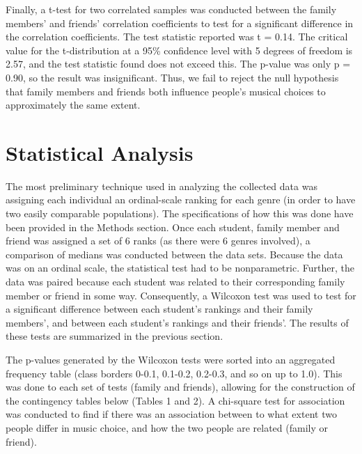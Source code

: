 \documentclass[12pt]{report}
\begin{document}
Finally, a t-test for two correlated samples was conducted between the family members' and friends' correlation coefficients to test for a significant difference in the correlation coefficients. The test statistic reported was t = 0.14. The critical value for the t-distribution at a 95\% confidence level with 5 degrees of freedom is 2.57, and the test statistic found does not exceed this. The p-value was only p = 0.90, so the result was insignificant. Thus, we fail to reject the null hypothesis that family members and friends both influence people's musical choices to approximately the same extent.

\chapter*{Statistical Analysis}
The most preliminary technique used in analyzing the collected data was assigning each individual an ordinal-scale ranking for each genre (in order to have two easily comparable populations). The specifications of how this was done have been provided in the Methods section. Once each student, family member and friend was assigned a set of 6 ranks (as there were 6 genres involved), a comparison of medians was conducted between the data sets. Because the data was on an ordinal scale, the statistical test had to be nonparametric. Further, the data was paired because each student was related to their corresponding family member or friend in some way. Consequently, a Wilcoxon test was used to test for a significant difference between each student's rankings and their family members', and between each student's rankings and their friends'. The results of these tests are summarized in the previous section.

The p-values generated by the Wilcoxon tests were sorted into an aggregated frequency table (class borders 0-0.1, 0.1-0.2, 0.2-0.3, and so on up to 1.0). This was done to each set of tests (family and friends), allowing for the construction of the contingency tables below (Tables 1 and 2). A chi-square test for association was conducted to find if there was an association between to what extent two people differ in music choice, and how the two people are related (family or friend).
\end{document}
